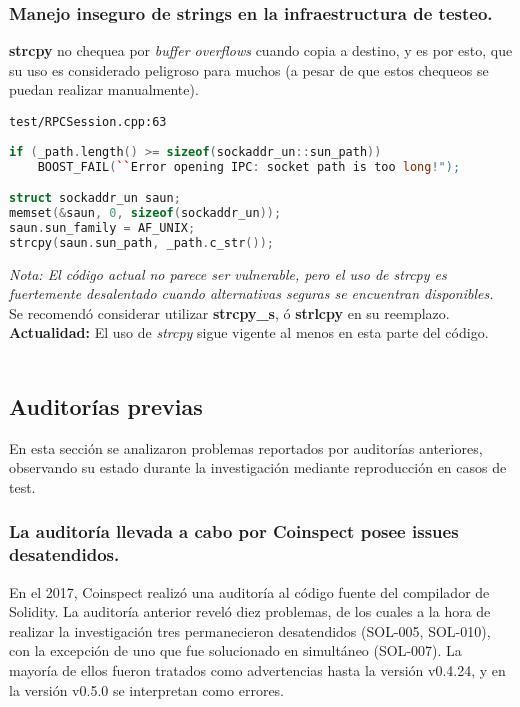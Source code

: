 \subsubsection{Manejo inseguro de strings en la infraestructura de testeo.}
\textbf{strcpy} no chequea por \textit{buffer overflows} cuando copia a destino, y es por esto, que su uso es considerado peligroso para muchos\cite{MSSDLBanned} (a pesar de que estos chequeos se puedan realizar manualmente).

\verb|test/RPCSession.cpp:63|

\begin{lstlisting}[language=c++]
if (_path.length() >= sizeof(sockaddr_un::sun_path))
    BOOST_FAIL(``Error opening IPC: socket path is too long!");

struct sockaddr_un saun;
memset(&saun, 0, sizeof(sockaddr_un));
saun.sun_family = AF_UNIX;
strcpy(saun.sun_path, _path.c_str());
\end{lstlisting}

\textit{Nota: El código actual no parece ser vulnerable, pero el uso de strcpy es fuertemente desalentado cuando alternativas seguras se encuentran disponibles.}\\

Se recomendó considerar utilizar \textbf{strcpy\_s}, ó \textbf{strlcpy} en su reemplazo.\\

\textbf{Actualidad:} El uso de \textit{strcpy} sigue vigente al menos en esta parte del código.\\\\

\subsection{Auditorías previas}
En esta sección se analizaron problemas reportados por auditorías anteriores, observando su estado durante la investigación mediante reproducción en casos de test.

\subsubsection{La auditoría llevada a cabo por Coinspect posee issues desatendidos.}

En el 2017, Coinspect realizó una auditoría\cite{SolidityCompilerAuditReport} al código fuente del compilador de Solidity. La auditoría anterior reveló diez problemas, de los cuales a la hora de realizar la investigación tres permanecieron desatendidos (SOL-005, SOL-010), con la excepción de uno que fue solucionado en simultáneo (SOL-007). La mayoría de ellos fueron tratados como advertencias hasta la versión v0.4.24, y en la versión v0.5.0 se interpretan como errores.\\


